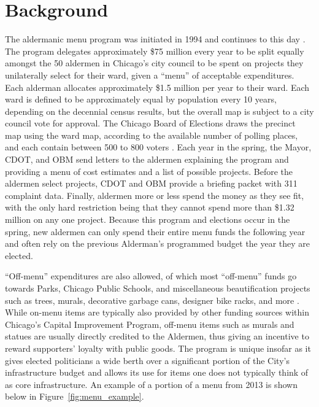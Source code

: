 \section{Background}\label{sec:background}

The aldermanic menu program was initiated in 1994 and continues to this day \cite{OIGaudit}. 
The program delegates approximately \$75 million every year to be split equally amongst the 50 aldermen in Chicago's city council to be spent on projects they unilaterally select for their ward, given a ``menu'' of acceptable expenditures. 
Each alderman allocates approximately \$1.5 million per year to their ward.
Each ward is defined to be approximately equal by population every 10 years, depending on the decennial census results, but the overall map is subject to a city council vote for approval.
The Chicago Board of Elections draws the precinct map using the ward map, according to the available number of polling places, and each contain between 500 to 800 voters \cite{Crowley_2022}.
Each year in the spring, the Mayor, CDOT, and OBM send letters to the aldermen explaining the program and providing a menu of cost estimates and a list of possible projects.
Before the aldermen select projects, CDOT and OBM provide a briefing packet with 311 complaint data.
Finally, aldermen more or less spend the money as they see fit, with the only hard restriction being that they cannot spend more than \$1.32 million on any one project.
Because this program and elections occur in the spring, new aldermen can only spend their entire menu funds the following year and often rely on the previous Alderman's programmed budget the year they are elected.

``Off-menu'' expenditures are also allowed, of which most ``off-menu'' funds go towards Parks, Chicago Public Schools, and miscellaneous beautification projects such as trees, murals, decorative garbage cans, designer bike racks, and more \cite{OIGaudit}. 
While on-menu items are typically also provided by other funding sources within Chicago's Capital Improvement Program, off-menu items such as murals and statues are usually directly credited to the Aldermen, thus giving an incentive to reward supporters' loyalty with public goods.
The program is unique insofar as it gives elected politicians a wide berth over a significant portion of the City's infrastructure budget and allows its use for items one does not typically think of as core infrastructure. 
An example of a portion of a menu from 2013 is shown below in Figure~\ref{fig:menu_example}.


